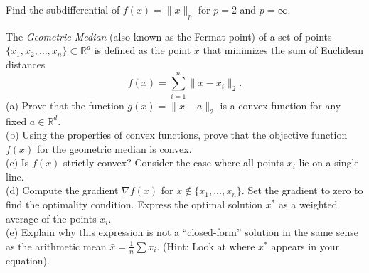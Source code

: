 \begin{myexercise}
Find the subdifferential of $f(x) =\|x\|_p$  for
$p=2$ and $p=\infty$.
\end{myexercise}


\begin{myexercise}
The {\em Geometric Median} (also known as the Fermat point) of a set of points $\{x_1, x_2, \dots, x_n\} \subset \mathbb{R}^d$ is defined as the point $x$ that minimizes the sum of Euclidean distances
$$f(x) = \sum_{i=1}^{n} \|x - x_i\|_2.$$
(a) Prove that the function $g(x) = \|x - a\|_2$ is a convex function for any fixed $a \in \mathbb{R}^d$. \\
(b) Using the properties of convex functions, prove that the objective function $f(x)$ for the geometric median is convex.\\
(c) Is $f(x)$ strictly convex? Consider the case where all points $x_i$ lie on a single line.\\
(d) Compute the gradient $\nabla f(x)$ for $x \notin \{x_1, \dots, x_n\}$. Set the gradient to zero to find the optimality condition. Express the optimal solution $x^*$ as a weighted average of the points $x_i$.\\
(e) Explain why this expression is not a ``closed-form'' solution in the same sense as the arithmetic mean $\bar{x} = \frac{1}{n}\sum x_i$. (Hint: Look at where $x^*$ appears in your equation).
\end{myexercise}


